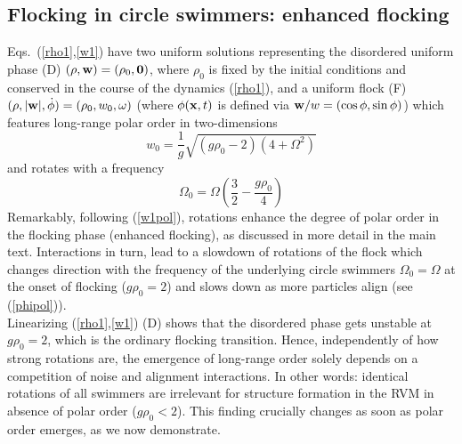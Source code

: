 \documentclass[aps,twocolumn,showlabels,showrefs,amsmath,amssymb,pre,superscriptaddress, floatfix, colors]{revtex4}
\newcommand{\1}{\begin{equation}}
\newcommand{\2}{\end{equation}}
\newcommand{\4}[2]{{\frac{#1}{#2}}}
\begin{document}
\subsection{Flocking in circle swimmers: enhanced flocking}
Eqs.~(\ref{rho1},\ref{w1}) have two uniform solutions representing the disordered uniform phase (D) 
$(\rho,{\bf w})=(\rho_0,{\bf 0})$, where $\rho_0$ is fixed by the initial conditions and conserved in the course of the dynamics (\ref{rho1}), and a uniform flock (F)
$(\rho,|{\bf w}|,\dot \phi)=(\rho_0,w_0,\omega)$ (where $\phi({\bf x},t)$ is defined via ${\bf w}/w=(\cos \phi,\sin \phi)$) which features long-range polar order in two-dimensions
\1 w_0 = \4{1}{g}\sqrt{(g \rho_0-2)(4+\Omega^2)} \label{w1pol}\2
and rotates with a frequency 
\1 \Omega_0 = \Omega \left(\4{3}{2}-\4{g \rho_0}{4}\right) \label{phipol}\2
Remarkably, following (\ref{w1pol}), rotations enhance the degree of polar order in the flocking phase (enhanced flocking), as discussed in more detail in the main text. 
Interactions in turn, lead to a slowdown of rotations of the flock which 
changes direction with the frequency of the underlying circle swimmers $\Omega_0=\Omega$ at the onset of flocking ($g \rho_0=2$) and slows down as more particles align (see (\ref{phipol})). 
\\Linearizing (\ref{rho1},\ref{w1}) (D) shows that the disordered phase gets unstable at $g\rho_0=2$, which is the ordinary flocking transition. Hence, 
independently of how strong rotations are, the emergence of long-range order 
solely depends on a competition of noise and alignment interactions. 
In other words: identical rotations of all swimmers are irrelevant for structure formation in the RVM in absence of polar order ($g \rho_0<2$).
This finding crucially changes as soon as polar order emerges, as we now demonstrate. 
\end{document}

